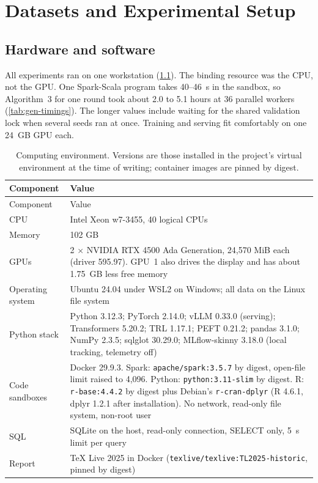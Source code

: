 \chapter{Datasets and Experimental Setup}\label{ch:setup}

\section{Hardware and software}

All experiments ran on one workstation (\cref{tab:env}). The binding resource was the CPU, not the GPU. One Spark-Scala
program takes 40--46~s in the sandbox, so Algorithm~3 for one round took about 2.0 to 5.1 hours at 36 parallel workers
(\cref{tab:gen-timings}). The longer values include waiting for the shared validation lock when several seeds ran at
once. Training and serving fit comfortably on one 24~GB GPU each.

{\small
{}
\begin{longtable}{@{}p{3.6cm}p{11.0cm}@{}}
\caption{Computing environment. Versions are those installed in the project's virtual environment at the time of
writing; container images are pinned by digest.}\label{tab:env}\\
\toprule\rowcolor{headshade}Component & Value\\\midrule\endfirsthead
\toprule\rowcolor{headshade}Component & Value\\\midrule\endhead
\bottomrule\endfoot
CPU & Intel Xeon w7-3455, 40 logical CPUs\\
Memory & 102 GB\\
GPUs & 2 $\times$ NVIDIA RTX 4500 Ada Generation, 24,570 MiB each (driver 595.97). GPU~1 also drives the display and
has about 1.75~GB less free memory\\
Operating system & Ubuntu 24.04 under WSL2 on Windows; all data on the Linux file system\\
Python stack & Python 3.12.3; PyTorch 2.14.0; vLLM 0.33.0 (serving); Transformers 5.20.2; TRL 1.17.1; PEFT 0.21.2;
pandas 3.1.0; NumPy 2.3.5; sqlglot 30.29.0; MLflow-skinny 3.18.0 (local tracking, telemetry off)\\
Code sandboxes & Docker 29.9.3. Spark: \texttt{apache/spark:3.5.7} by digest, open-file limit raised to 4,096.
Python: \texttt{python:3.11-slim} by digest. R: \texttt{r-base:4.4.2} by digest plus Debian's \texttt{r-cran-dplyr}
(R 4.6.1, dplyr 1.2.1 after installation). No network, read-only file system, non-root user\\
SQL & SQLite on the host, read-only connection, SELECT only, 5~s limit per query\\
Report & TeX Live 2025 in Docker (\texttt{texlive/texlive:TL2025-historic}, pinned by digest)\\
\end{longtable}
}

